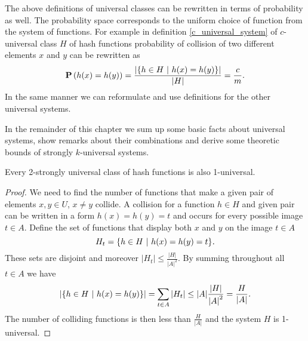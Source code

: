 The above definitions of universal classes can be rewritten in terms of probability as well. The probability space corresponds to the uniform choice of function from the system of functions. For example in definition \ref{c_universal_system} of $c$-universal class $H$ of hash functions probability of collision of two different elements $x$ and $y$ can be rewritten as
\[
	\mathbf{P}\left(h(x) = h(y)\right) = \frac{|\{h \in H \ | \  h(x) = h(y)\}|}{|H|} = \frac{c}{m} \text{.}
\]
In the same manner we can reformulate and use definitions for the other universal systems.

In the remainder of this chapter we sum up some basic facts about universal systems, show remarks about their combinations and derive some theoretic bounds of strongly $k$-universal systems.
\begin{remark}
Every 2-strongly universal class of hash functions is also 1-universal.
\end{remark}
\begin{proof}
We need to find the number of functions that make a given pair of elements $x, y \in U$, $x \neq y$ collide. A collision for a function $h \in H$ and given pair can be written in a form $h(x) = h(y) = t$ and occurs for every possible image $t \in A$. Define the set of functions that display both $x$ and $y$ on the image $t \in A$ \[ H_t = \lbrace h \in H \ | \  h(x) = h(y) = t \rbrace \textit{.} \] These sets are disjoint and moreover $|H_t| \leq \frac{|H|}{{|A|}^{2}}$. By summing throughout all $t \in A$ we have
\begin{displaymath}
|\lbrace h \in H \ | \  h(x) = h(y) \rbrace | = \displaystyle \sum_{t \in A} |H_t| \leq |A| \frac{|H|}{{|A|}^{2}} = \frac{H}{|A|}\textit{.}
\end{displaymath}
The number of colliding functions is then less than $\frac{H}{|A|}$ and the system $H$ is 1-universal.
\end{proof}

